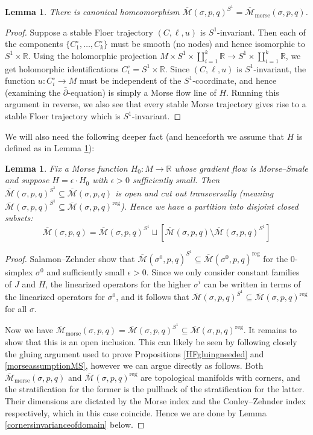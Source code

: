 \documentclass[12pt]{article}
\newtheorem{lemma}[theorem]{Lemma}
\theoremstyle{definition}
\theoremstyle{remark}
\numberwithin{equation}{subsection}
\newcommand{\RR}{\mathbb R}
\newcommand{\Mbar}{\overline{\mathcal M}}
\newcommand{\delbar}{\bar\partial}
\newcommand{\morse}{\mathrm{morse}}
\newcommand{\reg}{\mathrm{reg}}
\begin{document}
\begin{lemma}\label{fixedismorse}
There is canonical homeomorphism $\Mbar(\sigma,p,q)^{S^1}=\Mbar_\morse(\sigma,p,q)$.
\end{lemma}

\begin{proof}
Suppose a stable Floer trajectory $(C,\ell,u)$ is $S^1$-invariant.  Then each of the components $\{C_1^\circ,\ldots,C_k^\circ\}$ must be smooth (no nodes) and hence isomorphic to $S^1\times\RR$.  Using the holomorphic projection $M\times S^1\times\coprod_{i=1}^k\RR\to S^1\times\coprod_{i=1}^k\RR$, we get holomorphic identifications $C_i^\circ=S^1\times\RR$.  Since $(C,\ell,u)$ is $S^1$-invariant, the function $u:C_i^\circ\to M$ must be independent of the $S^1$-coordinate, and hence (examining the $\delbar$-equation) is simply a Morse flow line of $H$.  Running this argument in reverse, we also see that every stable Morse trajectory gives rise to a stable Floer trajectory which is $S^1$-invariant.
\end{proof}

We will also need the following deeper fact (and henceforth we assume that $H$ is defined as in Lemma \ref{morseistransverse}):

\begin{lemma}\label{morseistransverse}
Fix a Morse function $H_0:M\to\RR$ whose gradient flow is Morse--Smale and suppose $H=\epsilon\cdot H_0$ with $\epsilon>0$ sufficiently small.  Then $\Mbar(\sigma,p,q)^{S^1}\subseteq\Mbar(\sigma,p,q)$ is open and cut out transversally (meaning $\Mbar(\sigma,p,q)^{S^1}\subseteq\Mbar(\sigma,p,q)^\reg$).  Hence we have a partition into disjoint closed subsets:
\begin{equation}
\Mbar(\sigma,p,q)=\Mbar(\sigma,p,q)^{S^1}\sqcup[\Mbar(\sigma,p,q)\setminus\Mbar(\sigma,p,q)^{S^1}]
\end{equation}
\end{lemma}

\begin{proof}
Salamon--Zehnder \cite[p1342, Theorem 7.3(1)]{salamonzehnder} show that $\Mbar(\sigma^0,p,q)^{S^1}\subseteq\Mbar(\sigma^0,p,q)^\reg$ for the $0$-simplex $\sigma^0$ and sufficiently small $\epsilon>0$.  Since we only consider constant families of $J$ and $H$, the linearized operators for the higher $\sigma^i$ can be written in terms of the linearized operators for $\sigma^0$, and it follows that $\Mbar(\sigma,p,q)^{S^1}\subseteq\Mbar(\sigma,p,q)^\reg$ for all $\sigma$.

Now we have $\Mbar_\morse(\sigma,p,q)=\Mbar(\sigma,p,q)^{S^1}\subseteq\Mbar(\sigma,p,q)^\reg$.  It remains to show that this is an open inclusion.  This can likely be seen by following closely the gluing argument used to prove Propositions \ref{HFgluingneeded} and \ref{morseassumptionMS}, however we can argue directly as follows.  Both $\Mbar_\morse(\sigma,p,q)$ and $\Mbar(\sigma,p,q)^\reg$ are topological manifolds with corners, and the stratification for the former is the pullback of the stratification for the latter.  Their dimensions are dictated by the Morse index and the Conley--Zehnder index respectively, which in this case coincide.  Hence we are done by Lemma \ref{cornersinvarianceofdomain} below.
\end{proof}
\end{document}
